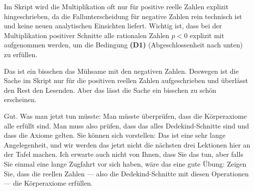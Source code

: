 \begin{math-stroke}

\begin{explanation-of-steps}
Im Skript wird die Multiplikation oft nur für positive reelle Zahlen explizit hingeschrieben, da die Fallunterscheidung für negative Zahlen rein technisch ist und keine neuen analytischen Einsichten liefert. Wichtig ist, dass bei der Multiplikation positiver Schnitte alle rationalen Zahlen $p < 0$ explizit mit aufgenommen werden, um die Bedingung \textbf{(D1)} (Abgeschlossenheit nach unten) zu erfüllen.
\end{explanation-of-steps}
\end{math-stroke}

\begin{spoken-clean}[01:10:00 - 01:12:45]
Das ist ein bisschen das Mühsame mit den negativen Zahlen. Deswegen ist die Sache im Skript nur für die positiven reellen Zahlen aufgeschrieben und überlässt den Rest den Lesenden. Aber das lässt die Sache ein bisschen zu schön erscheinen.

Gut. Was man jetzt tun müsste: Man müsste überprüfen, dass die Körperaxiome alle erfüllt sind. Man muss also prüfen, dass das alles Dedekind-Schnitte sind und dass die Axiome gelten. Sie können sich vorstellen: Das ist eine sehr lange Angelegenheit, und wir werden das jetzt nicht die nächsten drei Lektionen hier an der Tafel machen. Ich erwarte auch nicht von Ihnen, dass Sie das tun, aber falls Sie einmal eine lange Zugfahrt vor sich haben, wäre das eine gute Übung: Zeigen Sie, dass die reellen Zahlen --- also die Dedekind-Schnitte mit diesen Operationen --- die Körperaxiome erfüllen.
\end{spoken-clean}

